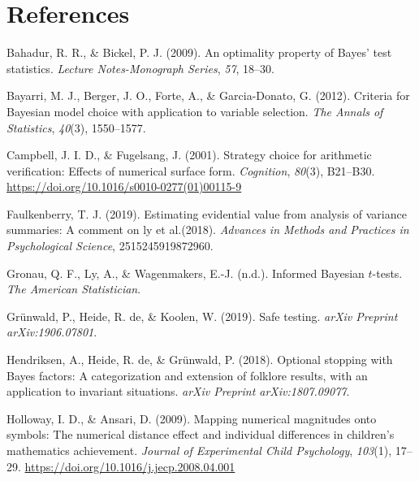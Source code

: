 \documentclass[english,,doc,floatsintext]{apa6}
\begin{document}
\newpage

\hypertarget{references}{%
\section{References}\label{references}}

\setlength{\parindent}{-0.5in}
\setlength{\leftskip}{0.5in}

\hypertarget{refs}{}
\leavevmode\hypertarget{ref-bahadur2009optimality}{}%
Bahadur, R. R., \& Bickel, P. J. (2009). An optimality property of Bayes' test statistics. \emph{Lecture Notes-Monograph Series}, \emph{57}, 18--30.

\leavevmode\hypertarget{ref-bayarri2012criteria}{}%
Bayarri, M. J., Berger, J. O., Forte, A., \& Garcia-Donato, G. (2012). Criteria for Bayesian model choice with application to variable selection. \emph{The Annals of Statistics}, \emph{40}(3), 1550--1577.

\leavevmode\hypertarget{ref-campbellFugelsang2001}{}%
Campbell, J. I. D., \& Fugelsang, J. (2001). Strategy choice for arithmetic verification: Effects of numerical surface form. \emph{Cognition}, \emph{80}(3), B21--B30. \url{https://doi.org/10.1016/s0010-0277(01)00115-9}

\leavevmode\hypertarget{ref-faulkenberry2019estimating}{}%
Faulkenberry, T. J. (2019). Estimating evidential value from analysis of variance summaries: A comment on ly et al.(2018). \emph{Advances in Methods and Practices in Psychological Science}, 2515245919872960.

\leavevmode\hypertarget{ref-gronauInpressinformed}{}%
Gronau, Q. F., Ly, A., \& Wagenmakers, E.-J. (n.d.). Informed Bayesian \(t\)-tests. \emph{The American Statistician}.

\leavevmode\hypertarget{ref-grunwald2019safe}{}%
Grünwald, P., Heide, R. de, \& Koolen, W. (2019). Safe testing. \emph{arXiv Preprint arXiv:1906.07801}.

\leavevmode\hypertarget{ref-hendriksen2018optional}{}%
Hendriksen, A., Heide, R. de, \& Grünwald, P. (2018). Optional stopping with Bayes factors: A categorization and extension of folklore results, with an application to invariant situations. \emph{arXiv Preprint arXiv:1807.09077}.

\leavevmode\hypertarget{ref-hollowayAnsari2009}{}%
Holloway, I. D., \& Ansari, D. (2009). Mapping numerical magnitudes onto symbols: The numerical distance effect and individual differences in children's mathematics achievement. \emph{Journal of Experimental Child Psychology}, \emph{103}(1), 17--29. \url{https://doi.org/10.1016/j.jecp.2008.04.001}
\end{document}
